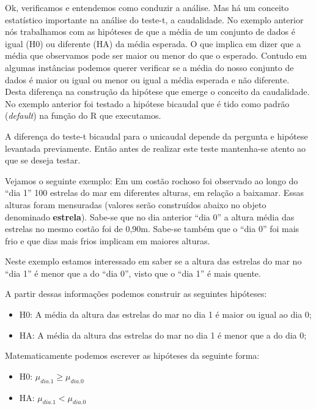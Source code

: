 \documentclass[14pt,titlepage, oneside, openany, a4paper]{book}
\providecommand{\tightlist}{%
  \setlength{\itemsep}{0pt}\setlength{\parskip}{0pt}}
\begin{document}
Ok, verificamos e entendemos como conduzir a análise. Mas há um conceito estatístico importante na análise do teste-t, a caudalidade. No exemplo anterior nós trabalhamos com as hipóteses de que a média de um conjunto de dados é igual (H0) ou diferente (HA) da média esperada. O que implica em dizer que a média que observamos pode ser maior ou menor do que o esperado. Contudo em algumas instâncias podemos querer verificar se a média do nosso conjunto de dados é maior ou igual ou menor ou igual a média esperada e não diferente. Desta diferença na construção da hipótese que emerge o conceito da caudalidade. No exemplo anterior foi testado a hipótese bicaudal que é tido como padrão (\emph{default}) na função do R que executamos.

A diferença do teste-t bicaudal para o unicaudal depende da pergunta e hipótese levantada previamente. Então antes de realizar este teste mantenha-se atento ao que se deseja testar.

Vejamos o seguinte exemplo: Em um costão rochoso foi observado ao longo do ``dia 1'' 100 estrelas do mar em diferentes alturas, em relação a baixamar. Essas alturas foram mensuradas (valores serão construídos abaixo no objeto denominado \textbf{estrela}). Sabe-se que no dia anterior ``dia 0'' a altura média das estrelas no mesmo costão foi de 0,90m. Sabe-se também que o ``dia 0'' foi mais frio e que dias mais frios implicam em maiores alturas.

Neste exemplo estamos interessado em saber se a altura das estrelas do mar no ``dia 1'' é menor que a do ``dia 0'', visto que o ``dia 1'' é mais quente.

A partir dessas informações podemos construir as seguintes hipóteses:

\begin{itemize}
\tightlist
\item
  H0: A média da altura das estrelas do mar no dia 1 é maior ou igual ao dia 0;
\item
  HA: A média da altura das estrelas do mar no dia 1 é menor que a do dia 0;
\end{itemize}

Matematicamente podemos escrever as hipóteses da seguinte forma:

\begin{itemize}
\tightlist
\item
  H0: \(\mu_{dia.1} \geq \mu_{dia.0}\)
\item
  HA: \(\mu_{dia.1} < \mu_{dia.0}\)
\end{itemize}
\end{document}
